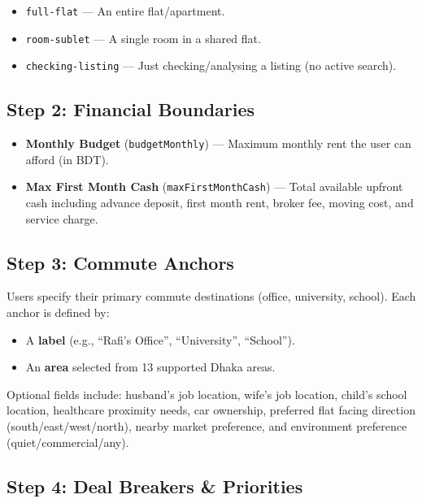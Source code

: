 \documentclass[12pt, a4paper, oneside]{report}
\begin{document}
\begin{itemize}[leftmargin=2em]
  \item \texttt{full-flat} --- An entire flat/apartment.
  \item \texttt{room-sublet} --- A single room in a shared flat.
  \item \texttt{checking-listing} --- Just checking/analysing a listing (no active search).
\end{itemize}

\subsection{Step 2: Financial Boundaries}

\begin{itemize}[leftmargin=2em]
  \item \textbf{Monthly Budget} (\texttt{budgetMonthly}) --- Maximum monthly rent the user can afford (in BDT).
  \item \textbf{Max First Month Cash} (\texttt{maxFirstMonthCash}) --- Total available upfront cash including advance deposit, first month rent, broker fee, moving cost, and service charge.
\end{itemize}

\subsection{Step 3: Commute Anchors}

Users specify their primary commute destinations (office, university, school). Each anchor is defined by:

\begin{itemize}[leftmargin=2em]
  \item A \textbf{label} (e.g., ``Rafi's Office'', ``University'', ``School'').
  \item An \textbf{area} selected from 13 supported Dhaka areas.
\end{itemize}

Optional fields include: husband's job location, wife's job location, child's school location, healthcare proximity needs, car ownership, preferred flat facing direction (south/east/west/north), nearby market preference, and environment preference (quiet/commercial/any).

\subsection{Step 4: Deal Breakers \& Priorities}
\end{document}
